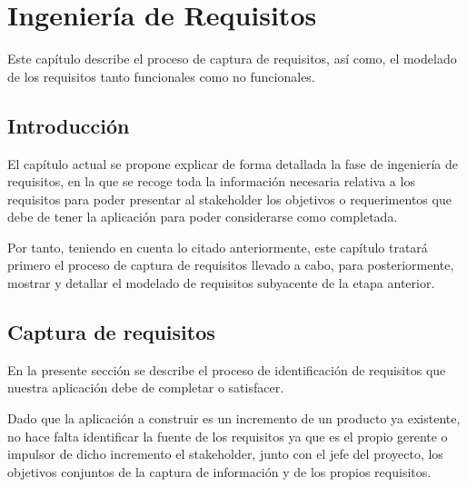 \documentclass[a4paper,12pt]{book}
\begin{document}
		
		
	 
	  \clearpage
	 
	

	\chapter{Ingeniería de Requisitos}
	
	Este capítulo describe el proceso de captura de requisitos, así como, el modelado de los requisitos tanto funcionales como no funcionales.
	
	\minitoc
	
	
	
		\section{Introducción}
		
		El capítulo actual se propone explicar de forma detallada la fase de ingeniería de requisitos, en la que se recoge toda la información necesaria relativa a los requisitos para poder presentar al stakeholder los objetivos o requerimentos que debe de tener la aplicación para poder considerarse como completada.
		
		\vspace{5mm}
		
		Por tanto, teniendo en cuenta lo citado anteriormente, este capítulo tratará primero el proceso de captura de requisitos llevado a cabo, para posteriormente, mostrar y detallar el modelado de requisitos subyacente de la etapa anterior.
		
		\section{Captura de requisitos}
		
		En la presente sección se describe el proceso de identificación de requisitos que nuestra aplicación debe de completar o satisfacer. 
		
		\vspace{5mm}
		
		Dado que la aplicación a construir es un incremento de un producto ya existente, no hace falta identificar la fuente de los requisitos ya que es el propio gerente o impulsor de dicho incremento el stakeholder, junto con el jefe del proyecto, los objetivos conjuntos de la captura de información y de los propios requisitos.
		
		\vspace{5mm}
		
\end{document}
